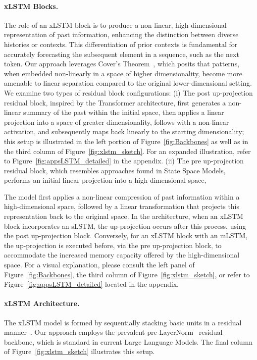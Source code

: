 \paragraph{xLSTM Blocks.}
\label{sec:xLSTMblock}
The role of an xLSTM block is to produce a non-linear, high-dimensional representation of past information, enhancing the distinction between diverse histories or contexts. This differentiation of prior contexts is fundamental for accurately forecasting the subsequent element in a sequence, such as the next token. Our approach leverages Cover’s Theorem~\citep{Cover:65}, which posits that patterns, when embedded non-linearly in a space of higher dimensionality, become more amenable to linear separation compared to the original lower-dimensional setting. We examine two types of residual block configurations: (i) The post up-projection residual block, inspired by the Transformer architecture, first generates a non-linear summary of the past within the initial space, then applies a linear projection into a space of greater dimensionality, follows with a non-linear activation, and subsequently maps back linearly to the starting dimensionality; this setup is illustrated in the left portion of Figure~\ref{fig:Backbones} as well as in the third column of Figure~\ref{fig:xlstm_sketch}. For an expanded illustration, refer to Figure~\ref{fig:appsLSTM_detailed} in the appendix. (ii) The pre up-projection residual block, which resembles approaches found in State Space Models, performs an initial linear projection into a high-dimensional space,

The model first applies a non-linear compression of past information within a high-dimensional space, followed by a linear transformation that projects this representation back to the original space. In the architecture, when an xLSTM block incorporates an sLSTM, the up-projection occurs after this process, using the post up-projection block. Conversely, for an xLSTM block with an mLSTM, the up-projection is executed before, via the pre up-projection block, to accommodate the increased memory capacity offered by the high-dimensional space. For a visual explanation, please consult the left panel of Figure~\ref{fig:Backbones}, the third column of Figure~\ref{fig:xlstm_sketch}, or refer to Figure~\ref{fig:appsLSTM_detailed} located in the appendix.

\paragraph{xLSTM Architecture. }
\label{sec:xLSTMarchitecure}
The xLSTM model is formed by sequentially stacking basic units in a residual manner~\citep{Srivastava:15,He:16}. Our approach employs the prevalent pre-LayerNorm~\citep{Ba:16b} residual backbone, which is standard in current Large Language Models. The final column of Figure~\ref{fig:xlstm_sketch} illustrates this setup.

